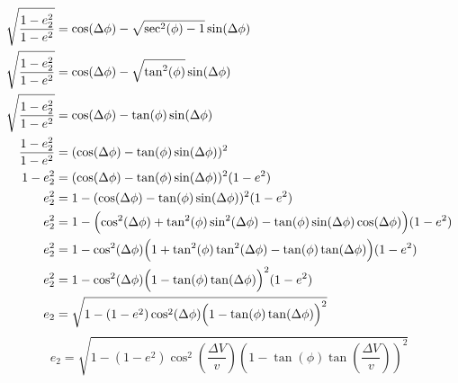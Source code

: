 \documentclass[../basicOrbitalDynamics.tex]{subfiles}
\begin{document}
\begin{align*}
    \sqrt{\frac{1-e_2^2}{1-e^2}}                                          & =\cos(\Delta \phi)-\sqrt{\sec^2(\phi)-1}\sin(\Delta \phi)                                                               \\
    \sqrt{\frac{1-e_2^2}{1-e^2}}                                          & =\cos(\Delta \phi)-\sqrt{\tan^2(\phi)}\sin(\Delta \phi)                                                                 \\
    \sqrt{\frac{1-e_2^2}{1-e^2}}                                          & =\cos(\Delta \phi)-\tan(\phi)\sin(\Delta \phi)                                                                          \\
    \frac{1-e_2^2}{1-e^2}                                                 & =(\cos(\Delta \phi)-\tan(\phi)\sin(\Delta \phi))^2                                                                      \\
    1-e_2^2                                                               & =(\cos(\Delta \phi)-\tan(\phi)\sin(\Delta\phi))^2(1-e^2)                                                                \\
    e_2^2                                                                 & =1-(\cos(\Delta \phi)-\tan(\phi)\sin(\Delta\phi))^2(1-e^2)                                                              \\
    e_2^2                                                                 & =1-\Bigl(\cos^2(\Delta\phi)+\tan^2(\phi)\sin^2(\Delta\phi)-\tan(\phi)\sin(\Delta\phi)\cos(\Delta\phi)\Bigr)(1-e^2)      \\
    e_2^2                                                                 & =1-\cos^2(\Delta\phi)\Bigl(1+\tan^2(\phi)\tan^2(\Delta\phi)-\tan(\phi)\tan(\Delta\phi)\Bigr)(1-e^2)                     \\
    e_2^2                                                                 & =1-\cos^2(\Delta\phi)\Bigl(1-\tan(\phi)\tan(\Delta\phi)\Bigr)^2(1-e^2)                                                  \\
    e_2                                                                   & =\sqrt{1-(1-e^2)\cos^2(\Delta\phi)\Bigl(1-\tan(\phi)\tan(\Delta\phi)\Bigr)^2}
\end{align*}
\begin{equation*}
    e_2=\sqrt{1-(1-e^2)\cos^2\left(\frac{\Delta V}{v}\right)\left(1-\tan(\phi)\tan\left(\frac{\Delta V}{v}\right)\right)^2}
\end{equation*}
\end{document}
